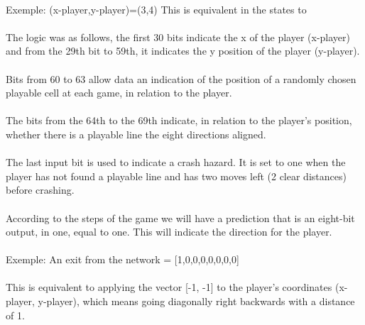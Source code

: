 \documentclass{article}
\begin{document}
\paragraph{}
\setlength{\parindent}{2cm}
Exemple: (x-player,y-player)=(3,4) This is equivalent in the states to
\newline
[0,0,0,1,0,0,0,0,0,0,0,0,0,0,0,0,0,0,0,0,0,0,0,0,0,0,0,0,
0,0,0,0,0,1,0,0,0,0,0,0,0,
\newline
0,0,0,0,0,0,0,0,0,0,0,0,0,0,0,0,0,0,0,0]
\paragraph{}
\setlength{\parindent}{2cm}
The logic was as follows, the first 30 bits indicate the x of the player (x-player) and from the 29th bit to 59th, it indicates the y position of the player (y-player).
\paragraph{}
\setlength{\parindent}{2cm}
Bits from 60 to 63 allow data an indication of the position of a randomly chosen playable cell at each game, in relation to the player.
\paragraph{}
\setlength{\parindent}{2cm}
The bits from the 64th to the 69th indicate, in relation to the player's position, whether there is a playable line the eight directions aligned.
\paragraph{}
\setlength{\parindent}{2cm}
The last input bit is used to indicate a crash hazard. It is set to one when the player has not found a playable line and has two moves left (2 clear distances) before crashing.
\paragraph{}
\setlength{\parindent}{2cm}
According to the steps of the game we will have a prediction that is an eight-bit output, in one, equal to one. This will indicate the direction for the player.
\paragraph{}
\setlength{\parindent}{2cm}
Exemple: An exit from the network = [1,0,0,0,0,0,0,0]
\paragraph{}
\setlength{\parindent}{2cm}
This is equivalent to applying the vector [-1, -1] to the player's coordinates (x-player, y-player), which means going diagonally right backwards with a distance of 1.
\end{document}
